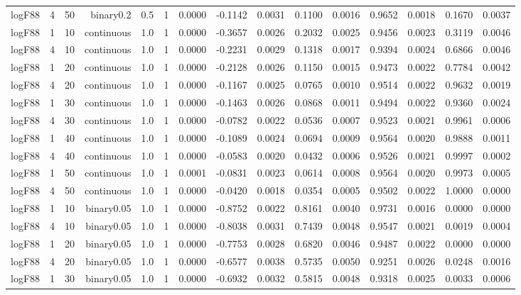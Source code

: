 \begin{longtable}{rrrrrrrrrrrrrrr}
  logF88 & 4 & 50 & binary0.2 & 0.5 & 1 & 0.0000 & -0.1142 & 0.0031 & 0.1100 & 0.0016 & 0.9652 & 0.0018 & 0.1670 & 0.0037 \\ 
  logF88 & 1 & 10 & continuous & 1.0 & 1 & 0.0000 & -0.3657 & 0.0026 & 0.2032 & 0.0025 & 0.9456 & 0.0023 & 0.3119 & 0.0046 \\ 
  logF88 & 4 & 10 & continuous & 1.0 & 1 & 0.0000 & -0.2231 & 0.0029 & 0.1318 & 0.0017 & 0.9394 & 0.0024 & 0.6866 & 0.0046 \\ 
  logF88 & 1 & 20 & continuous & 1.0 & 1 & 0.0000 & -0.2128 & 0.0026 & 0.1150 & 0.0015 & 0.9473 & 0.0022 & 0.7784 & 0.0042 \\ 
  logF88 & 4 & 20 & continuous & 1.0 & 1 & 0.0000 & -0.1167 & 0.0025 & 0.0765 & 0.0010 & 0.9514 & 0.0022 & 0.9632 & 0.0019 \\ 
  logF88 & 1 & 30 & continuous & 1.0 & 1 & 0.0000 & -0.1463 & 0.0026 & 0.0868 & 0.0011 & 0.9494 & 0.0022 & 0.9360 & 0.0024 \\ 
  logF88 & 4 & 30 & continuous & 1.0 & 1 & 0.0000 & -0.0782 & 0.0022 & 0.0536 & 0.0007 & 0.9523 & 0.0021 & 0.9961 & 0.0006 \\ 
  logF88 & 1 & 40 & continuous & 1.0 & 1 & 0.0000 & -0.1089 & 0.0024 & 0.0694 & 0.0009 & 0.9564 & 0.0020 & 0.9888 & 0.0011 \\ 
  logF88 & 4 & 40 & continuous & 1.0 & 1 & 0.0000 & -0.0583 & 0.0020 & 0.0432 & 0.0006 & 0.9526 & 0.0021 & 0.9997 & 0.0002 \\ 
  logF88 & 1 & 50 & continuous & 1.0 & 1 & 0.0001 & -0.0831 & 0.0023 & 0.0614 & 0.0008 & 0.9564 & 0.0020 & 0.9973 & 0.0005 \\ 
  logF88 & 4 & 50 & continuous & 1.0 & 1 & 0.0000 & -0.0420 & 0.0018 & 0.0354 & 0.0005 & 0.9502 & 0.0022 & 1.0000 & 0.0000 \\ 
  logF88 & 1 & 10 & binary0.05 & 1.0 & 1 & 0.0000 & -0.8752 & 0.0022 & 0.8161 & 0.0040 & 0.9731 & 0.0016 & 0.0000 & 0.0000 \\ 
  logF88 & 4 & 10 & binary0.05 & 1.0 & 1 & 0.0000 & -0.8038 & 0.0031 & 0.7439 & 0.0048 & 0.9547 & 0.0021 & 0.0019 & 0.0004 \\ 
  logF88 & 1 & 20 & binary0.05 & 1.0 & 1 & 0.0000 & -0.7753 & 0.0028 & 0.6820 & 0.0046 & 0.9487 & 0.0022 & 0.0000 & 0.0000 \\ 
  logF88 & 4 & 20 & binary0.05 & 1.0 & 1 & 0.0000 & -0.6577 & 0.0038 & 0.5735 & 0.0050 & 0.9251 & 0.0026 & 0.0248 & 0.0016 \\ 
  logF88 & 1 & 30 & binary0.05 & 1.0 & 1 & 0.0000 & -0.6932 & 0.0032 & 0.5815 & 0.0048 & 0.9318 & 0.0025 & 0.0033 & 0.0006 \\ 

\end{longtable}
